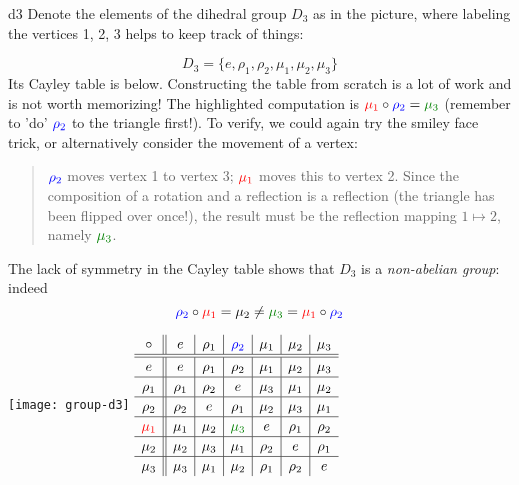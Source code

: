 \begin{example}{}{d3}
	Denote the elements of the dihedral group $D_3$ as in the picture, where labeling the vertices 1, 2, 3 helps to keep track of things:\par
	\begin{minipage}{0.67\textwidth}\vspace{-5pt}
		\[
			D_3=\bigl\{e,\rho_1,\rho_2,\mu_1,\mu_2,\mu_3\bigr\}
		\]
		Its Cayley table is below. Constructing the table from scratch is a lot of work and is not worth memorizing!\smallbreak
		 The highlighted computation is $\textcolor{red}{\mu_1}\circ\textcolor{blue}{\rho_2}=\textcolor{Green}{\mu_3}$ (remember to 'do' $\textcolor{blue}{\rho_2}$ to the triangle first!). To verify, we could again try the smiley face trick, or alternatively consider the movement of a vertex:
		\begin{quote}
			$\textcolor{blue}{\rho_2}$ moves vertex 1 to vertex 3; $\textcolor{red}{\mu_1}$ moves this to vertex 2. Since the composition of a rotation and a reflection is a reflection (the triangle has been flipped over once!), the result must be the reflection mapping $1\mapsto 2$, namely $\textcolor{Green}{\mu_3}$.
		\end{quote}
		The lack of symmetry in the Cayley table shows that $D_3$ is a \emph{non-abelian group}: indeed
		\[
			\textcolor{blue}{\rho_2}\circ\textcolor{red}{\mu_1} =\mu_2\neq \textcolor{Green}{\mu_3}=\textcolor{red}{\mu_1}\circ\textcolor{blue}{\rho_2}
		\]
	\end{minipage}
	\hfill
	\begin{minipage}{0.32\textwidth}\vspace{-12pt}
		\flushright\texttt{[image: group-d3]}\smallbreak
		$\def\arraystretch{1.15}\begin{array}{c||c|c|c|c|c|c}
			\circ & e & \rho_1 & \textcolor{blue}{\rho_2} & \mu_1 & \mu_2 & \mu_3\\
			 \hline\hline
			e & e & \rho_1 & \rho_2 & \mu_1 & \mu_2 & \mu_3\\
			\hline
			\rho_1 & \rho_1 & \rho_2 & e & \mu_3 & \mu_1 & \mu_2\\
			\hline
			\rho_2 & \rho_2 & e & \rho_1 & \mu_2 & \mu_3 & \mu_1\\
			\hline
			\textcolor{red}{\mu_1} & \mu_1 & \mu_2 & \textcolor{Green}{\mu_3} & e & \rho_1 & \rho_2\\
			\hline
			\mu_2 & \mu_2 & \mu_3 & \mu_1 & \rho_2 & e & \rho_1\\
			\hline
			\mu_3 & \mu_3 & \mu_1 & \mu_2 & \rho_1 & \rho_2 & e
		\end{array}$
	\end{minipage}\bigbreak	
\end{example}


